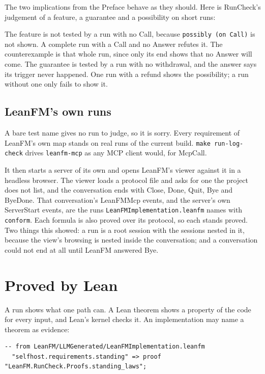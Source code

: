 The two implications from the Preface behave as they should. Here is RunCheck's judgement of a
feature, a guarantee and a possibility on short runs:


The feature is not tested by a run with no Call, because \texttt{possibly (on Call)} is not
shown. A complete run with a Call and no Answer refutes it. The counterexample is that whole run,
since only its end shows that no Answer will come. The guarantee is tested by a run with no
withdrawal, and the answer says its trigger never happened. One run with a refund shows the
possibility; a run without one only fails to show it.

\subsection{LeanFM's own runs}

{\sloppy A bare test name gives no run to judge, so it is sorry. Every requirement of LeanFM's own
map stands on real runs of the current build. \texttt{make run-log-check} drives
\texttt{leanfm-mcp} as any MCP client would, for McpCall.\par}

{\sloppy It then starts a server of its own and
opens LeanFM's viewer against it in a headless browser. The viewer loads a protocol file and asks
for one the project does not list, and the conversation ends with Close, Done, Quit, Bye and
ByeDone. That conversation's LeanFMMcp events, and the server's own ServerStart events, are the
runs \texttt{LeanFMImplementation.leanfm} names with \texttt{conform}. Each formula is also proved
over its protocol, so each stands proved. Two things this showed: a run is a root session with the
sessions nested in it, because the view's browsing is nested inside the conversation; and a
conversation could not end at all until LeanFM answered Bye.\par}

\section{Proved by Lean}

A run shows what one path can. A Lean theorem shows a property of the code for every input, and
Lean's kernel checks it. An implementation may name a theorem as evidence:

\begin{lstlisting}[language={}]
-- from LeanFM/LLMGenerated/LeanFMImplementation.leanfm
  "selfhost.requirements.standing" => proof "LeanFM.RunCheck.Proofs.standing_laws";
\end{lstlisting}

